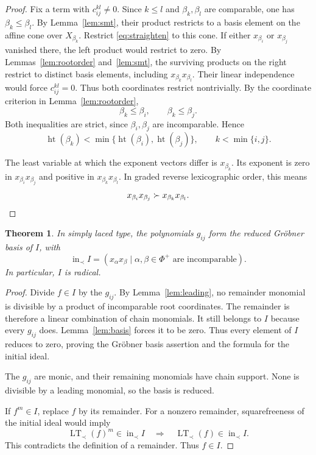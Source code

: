 \documentclass[12pt]{article}
\newtheorem{theorem}{Theorem}[section]
\theoremstyle{definition}
\DeclareMathOperator{\height}{ht}
\DeclareMathOperator{\inid}{in}
\DeclareMathOperator{\LT}{LT}
\begin{document}
\begin{proof}
    Fix a term with $c_{ij}^{kl}\ne0$. Since $k\leq l$ and $\beta_k,\beta_l$ are comparable, one has $\beta_k\leq\beta_l$. By Lemma~\ref{lem:smt}, their product restricts to a basis element on the affine cone over $X_{\beta_k}$. Restrict \eqref{eq:straighten} to this cone. If either $x_{\beta_i}$ or $x_{\beta_j}$ vanished there, the left product would restrict to zero. By Lemmas~\ref{lem:rootorder} and~\ref{lem:smt}, the surviving products on the right restrict to distinct basis elements, including $x_{\beta_k}x_{\beta_l}$. Their linear independence would force $c_{ij}^{kl}=0$. Thus both coordinates restrict nontrivially. By the coordinate criterion in Lemma~\ref{lem:rootorder},
    $$
        \beta_k\leq\beta_i,\qquad\beta_k\leq\beta_j.
    $$
    Both inequalities are strict, since $\beta_i,\beta_j$ are incomparable. Hence
    $$
        \height(\beta_k)<\min\{\height(\beta_i),\height(\beta_j)\},
        \qquad k<\min\{i,j\}.
    $$

    The least variable at which the exponent vectors differ is $x_{\beta_k}$. Its exponent is zero in $x_{\beta_i}x_{\beta_j}$ and positive in $x_{\beta_k}x_{\beta_l}$. In graded reverse lexicographic order, this means
    \[
        x_{\beta_i}x_{\beta_j}\succ x_{\beta_k}x_{\beta_l}.\qedhere
    \]
\end{proof}

\begin{theorem}\label{thm:groebner}
    In simply laced type, the polynomials $g_{ij}$ form the reduced Gr\"obner basis of $I$, with
    $$
        \inid_\prec I=(x_\alpha x_\beta\mid\alpha,\beta\in\Phi^+\text{ are incomparable}).
    $$
    In particular, $I$ is radical.
\end{theorem}

\begin{proof}
    Divide $f\in I$ by the $g_{ij}$. By Lemma~\ref{lem:leading}, no remainder monomial is divisible by a product of incomparable root coordinates. The remainder is therefore a linear combination of chain monomials. It still belongs to $I$ because every $g_{ij}$ does. Lemma~\ref{lem:basis} forces it to be zero. Thus every element of $I$ reduces to zero, proving the Gr\"obner basis assertion and the formula for the initial ideal.

    The $g_{ij}$ are monic, and their remaining monomials have chain support. None is divisible by a leading monomial, so the basis is reduced.

    If $f^m\in I$, replace $f$ by its remainder. For a nonzero remainder, squarefreeness of the initial ideal would imply
    $$
        \LT_\prec(f)^m\in\inid_\prec I
        \quad\Longrightarrow\quad
        \LT_\prec(f)\in\inid_\prec I.
    $$
    This contradicts the definition of a remainder. Thus $f\in I$.
\end{proof}
\end{document}
